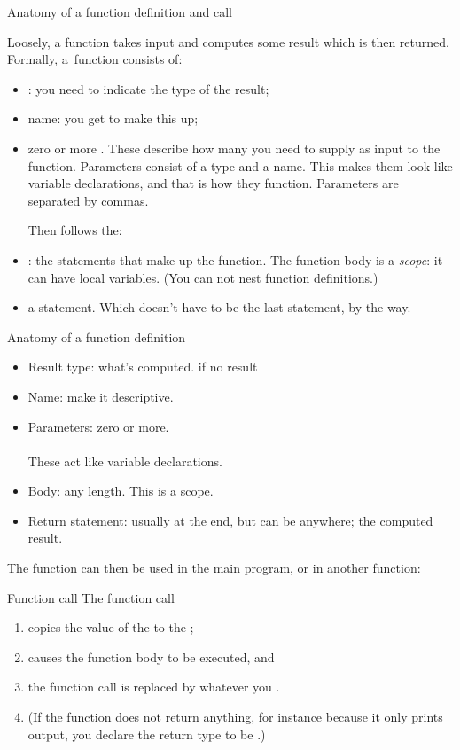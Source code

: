  {Anatomy of a function definition and call}

Loosely, a function takes input and computes some result which is then returned.
Formally, a~function consists of:
\begin{itemize}
\item {}: you need to indicate
  the type of the result;
\item name: you get to make this up;
\item zero or more . These describe
  how many  you need to supply as
  input to the function. Parameters consist of a type and a name. This
  makes them look like variable declarations, and that is how they
  function. Parameters are separated by commas.

  Then follows the:
\item {}: the statements that make up
  the function. The function body is a \emph{scope}: it can have local
  variables. (You can not nest function definitions.)
\item a  statement. Which doesn't have to be
  the last statement, by the way.
\end{itemize}

\begin{slide}{Anatomy of a function definition}
  \label{sl:func-anatomy}
  \begin{itemize}
  \item Result type: what's computed.  if no result
  \item Name: make it descriptive.
  \item Parameters: zero or more.\\
    \\
    These act like variable declarations.
  \item Body: any length. This is a scope.
  \item Return statement: usually at the end, but can be anywhere; the
    computed result.
  \end{itemize}
\end{slide}

The function can then be used in the main program, or in another function:
\begin{block}{Function call}
  \label{sl:func-call}
  The function call
  \begin{enumerate}
  \item copies the value of the 
    to the ;
  \item causes the function body to be executed, and
  \item the function call is replaced by whatever you .
  \item (If the function does not return anything, for instance because
    it only prints output, you declare the return type to be .)
  \end{enumerate}
\end{block}

